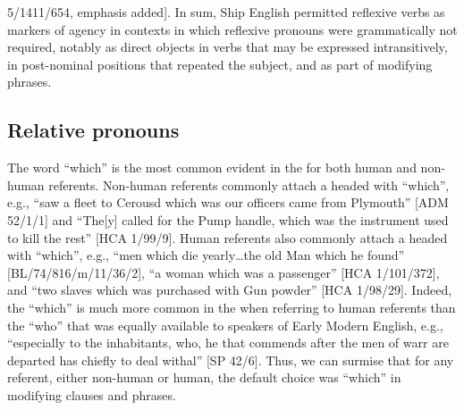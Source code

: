 5/1411/654, emphasis added]. In sum, Ship English permitted reflexive verbs as markers of  agency in contexts in which reflexive pronouns were grammatically not required, notably as direct objects in verbs that may be expressed intransitively, in post-nominal positions that repeated the subject, and as part of modifying phrases. 

\subsection{{Relative pronouns}}\label{sec:5.4.6}

The word “which” is the most common  evident in the  for both human and non-human referents. Non-human  referents commonly attach a  headed with “which”, e.g., “saw a fleet to Cerousd which was our officers came from Plymouth” [ADM 52/1/1] and “The[y] called for the Pump handle, which was the instrument used to kill the rest” [HCA 1/99/9]. Human  referents also commonly attach a  headed with “which”, e.g., “men which die yearly…the old Man which he found” [BL/74/816/m/11/36/2], “a woman which was a passenger” [HCA 1/101/372], and “two slaves which was purchased with Gun powder” [HCA 1/98/29]. Indeed, the  “which” is much more common in the  when referring to human referents than the  “who” that was equally available to speakers of Early Modern English, e.g., “especially to the inhabitants, who, he that commends after the men of warr are departed has chiefly to deal withal” [SP 42/6]. Thus, we can surmise that for any  referent, either non-human or human, the default  choice was “which” in modifying clauses and phrases. 

